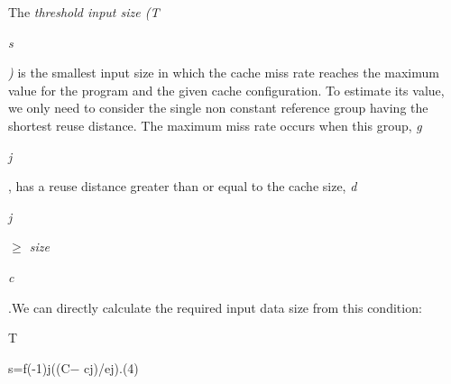 \documentclass[12pt]{article}
\begin{document}
\vspace{\baselineskip}
\begin{adjustwidth}{0.0in}{0.01in}
{\fontsize{10pt}{12.0pt}\selectfont \textcolor[HTML]{333333}{The \textit{threshold input size (T}}{\fontsize{7pt}{8.4pt}\selectfont \textit{\textcolor[HTML]{333333}{s}}{\fontsize{10pt}{12.0pt}\selectfont \textit{\textcolor[HTML]{333333}{)}}\textcolor[HTML]{333333}{ is the smallest input size in which the cache miss rate reaches the maximum value for the program and the given cache configuration. To estimate its value, we only need to consider the single non constant reference group having the shortest reuse distance. The maximum miss rate occurs when this group, \textit{g}}{\fontsize{7pt}{8.4pt}\selectfont \textit{\textcolor[HTML]{333333}{j}}{\fontsize{10pt}{12.0pt}\selectfont \textcolor[HTML]{333333}{, has a reuse distance greater than or equal to the cache size, \textit{d}}{\fontsize{7pt}{8.4pt}\selectfont \textit{\textcolor[HTML]{333333}{j}}{\fontsize{10pt}{12.0pt}\selectfont \textcolor[HTML]{333333}{ \textit{$ \geq $  size}}{\fontsize{7pt}{8.4pt}\selectfont \textit{\textcolor[HTML]{333333}{c}}{\fontsize{10pt}{12.0pt}\selectfont \textcolor[HTML]{333333}{.We can directly calculate the required input data size from this condition:}\par}\par}\par}\par}\par}\par}\par}\par}\par}\par

\end{adjustwidth}


\vspace{\baselineskip}

\vspace{\baselineskip}
\begin{adjustwidth}{1.64in}{0.0in}
\textcolor[HTML]{333333}{T}{\fontsize{8pt}{9.6pt}\selectfont \textcolor[HTML]{333333}{s=f(-1)j((C$-$ cj)/ej).(4)}\par}\par

\end{adjustwidth}
\end{document}
